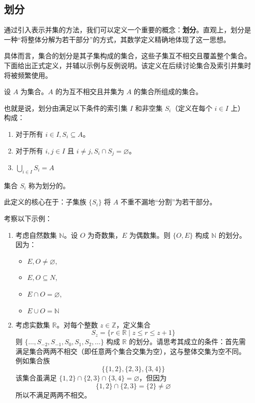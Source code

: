 \subsection{划分}

通过引入表示并集的方法，我们可以定义一个重要的概念：\textbf{划分}。直观上，划分是一种``将整体分解为若干部分''的方式，其数学定义精确地体现了这一思想。

具体而言，集合的划分是其子集构成的集合，这些子集互不相交且覆盖整个集合。下面给出正式定义，并辅以示例与反例说明。该定义在后续讨论集合及索引并集时将被频繁使用。

\begin{definition}\label{def:definition3.6.9}
    设 $A$ 为集合。$A$ 的为互不相交且并集为 $A$ 的集合所组成的集合。

    也就是说，划分由满足以下条件的索引集 $I$ 和非空集 $S_i$（定义在每个 $i \in I$ 上）构成：
    \begin{enumerate}[label=(\arabic*)]
        \item 对于所有 $i \in I, S_i \subseteq A$。
        \item 对于所有 $i, j \in I \text{\ 且\ } i \ne j, S_i \cap S_j = \varnothing$。
        \item $\displaystyle \bigcup_{i \in I} S_i = A$
    \end{enumerate}
    集合 $S_i$ 称为划分的。
\end{definition}

此定义的核心在于：子集族 $\{S_i\}$ 将 $A$ 不重不漏地``分割''为若干部分。

\begin{example}
    考察以下示例：
    \begin{enumerate}[label=(\arabic*)]
        \item 考虑自然数集 $\mathbb{N}$。设 $O$ 为奇数集，$E$ 为偶数集。则 $\{O, E\}$ 构成 $\mathbb{N}$ 的划分。因为：
        \begin{itemize}
            \item $E, O \ne \varnothing$,
            \item $E, O \subseteq N$,
            \item $E \cap O = \varnothing$,
            \item $E \cup O = \mathbb{N}$ 
        \end{itemize}
        \item 考虑实数集 $\mathbb{R}$。对每个整数 $z \in \mathbb{Z}$，定义集合
        \[S_z = \{r \in \mathbb{R} \mid z \le r \le z + 1\}\]
        则 $\{\dots, S_{-2}, S_{-1}, S_0, S_1, S_2, \dots \}$ 构成 $\mathbb{R}$ 的划分。请思考其成立的条件：首先需满足集合两两不相交（即任意两个集合交集为空），这与整体交集为空不同。例如集合族
        \[\big\{\{1, 2\}, \{2, 3\}, \{3, 4\}\big\}\]
        该集合虽满足 $\{1, 2\} \cap \{2, 3\} \cap \{3, 4\} = \varnothing$，但因为
        \[\{1, 2\} \cap \{2, 3\} = \{2\} \ne \varnothing\]
        所以不满足两两不相交。
    \end{enumerate}
\end{example}

